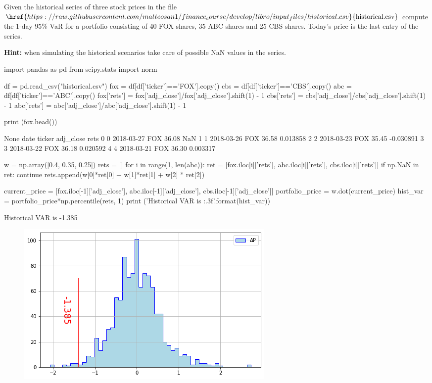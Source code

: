 \begin{question}
Given the historical series of three stock prices in the file
\(\href{https://raw.githubusercontent.com/matteosan1/finance_course/develop/libro/input_files/historical.csv}{\textrm{historical.csv}}\)
compute the 1-day 95\% VaR for a portfolio consisting of 40 FOX shares, 35 ABC shares and 25 CBS shares. 
Today's price is the last entry of the series.

\noindent\textbf{Hint:} when simulating the historical scenarios take care of possible NaN values
in the series. 
\end{question}

\cprotEnv\begin{solution}
\begin{ipython}
import pandas as pd
from scipy.stats import norm

df = pd.read_csv("historical.csv")
fox = df[df['ticker']=='FOX'].copy()
cbs = df[df['ticker']=='CBS'].copy()
abc = df[df['ticker']=='ABC'].copy()
fox['rets'] = fox['adj_close']/fox['adj_close'].shift(1) - 1
cbs['rets'] = cbs['adj_close']/cbs['adj_close'].shift(1) - 1
abc['rets'] = abc['adj_close']/abc['adj_close'].shift(1) - 1

print (fox.head())
\end{ipython}
\begin{ioutput}
None      date ticker adj_close      rets
0 0 2018-03-27    FOX     36.08       NaN
1 1 2018-03-26    FOX     36.58  0.013858
2 2 2018-03-23    FOX     35.45 -0.030891
3 3 2018-03-22    FOX     36.18  0.020592
4 4 2018-03-21    FOX     36.30  0.003317
\end{ioutput}
\begin{ipython}
w = np.array([0.4, 0.35, 0.25])
rets = []
for i in range(1, len(abc)):
    ret = [fox.iloc[i]['rets'], abc.iloc[i]['rets'],
           cbs.iloc[i]['rets']]
    if np.NaN in ret:
        continue
    rets.append(w[0]*ret[0] + w[1]*ret[1] + w[2] * ret[2])

current_price = [fox.iloc[-1]['adj_close'],
                 abc.iloc[-1]['adj_close'],
                 cbs.iloc[-1]['adj_close']]
portfolio_price = w.dot(current_price)
hist_var = portfolio_price*np.percentile(rets, 1)
print ('Historical VAR is {:.3f}'.format(hist_var))
\end{ipython}
\begin{ioutput}
Historical VAR is -1.385
\end{ioutput}
\begin{figure}[htbp]
	\centering
\includegraphics[width=0.7\linewidth]{figures/hist_var_ex}
\end{figure}
\end{solution}

